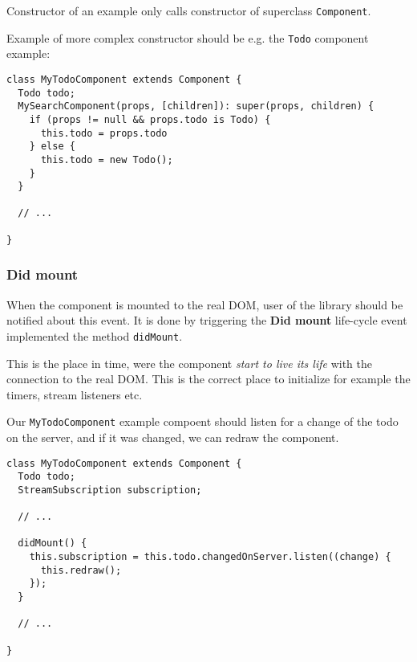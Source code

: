 \documentclass[oneside, 12pt]{book}
\begin{document}
      Constructor of an example only calls constructor of superclass \texttt{Component}.

      Example of more complex constructor should be e.g. the \texttt{Todo} component example:
      \begin{verbatim}
class MyTodoComponent extends Component {
  Todo todo;
  MySearchComponent(props, [children]): super(props, children) {
    if (props != null && props.todo is Todo) {
      this.todo = props.todo
    } else {
      this.todo = new Todo();
    }
  }

  // ...

}
      \end{verbatim}



    \subsubsection{Did mount}\label{subsec:our-architecture-lifecycle-didmount}

			When the component is mounted to the real DOM, user of the library should be notified about this event. 
			It is done by triggering the \textbf{Did mount} life-cycle event implemented the method \texttt{didMount}. 

			This is the place in time, were the component \textit{start to live its life} with the connection to the real DOM.
      This is the correct place to initialize for example the timers, stream listeners etc. 

      Our \texttt{MyTodoComponent} example compoent should listen for a change of the todo on the server, 
      and if it was changed, we can redraw the component.
      \begin{verbatim}
class MyTodoComponent extends Component {
  Todo todo;
  StreamSubscription subscription;

  // ...

  didMount() {
    this.subscription = this.todo.changedOnServer.listen((change) {
      this.redraw();
    });
  }

  // ...

}
      \end{verbatim}

\end{document}

